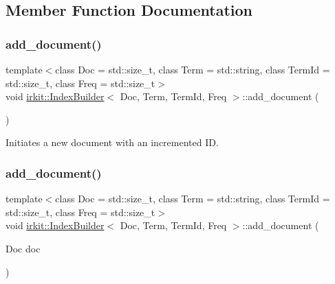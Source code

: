 \subsection{Member Function Documentation}
\mbox{\label{classirkit_1_1IndexBuilder_a8a18c112d48e21a89aefa9a931a536ab}} 
\subsubsection{\texorpdfstring{add\+\_\+document()}{add\_document()}\hspace{0.1cm}{\footnotesize\ttfamily [1/2]}}
{\footnotesize\ttfamily template$<$class Doc  = std\+::size\+\_\+t, class Term  = std\+::string, class Term\+Id  = std\+::size\+\_\+t, class Freq  = std\+::size\+\_\+t$>$ \\
void \mbox{\hyperlink{classirkit_1_1IndexBuilder}{irkit\+::\+Index\+Builder}}$<$ Doc, Term, Term\+Id, Freq $>$\+::add\+\_\+document (\begin{DoxyParamCaption}{ }\end{DoxyParamCaption})\hspace{0.3cm}{\ttfamily [inline]}}



Initiates a new document with an incremented ID. 

\mbox{\label{classirkit_1_1IndexBuilder_a31b062283c9b7203ce4a65a5bd744fae}} 
\subsubsection{\texorpdfstring{add\+\_\+document()}{add\_document()}\hspace{0.1cm}{\footnotesize\ttfamily [2/2]}}
{\footnotesize\ttfamily template$<$class Doc  = std\+::size\+\_\+t, class Term  = std\+::string, class Term\+Id  = std\+::size\+\_\+t, class Freq  = std\+::size\+\_\+t$>$ \\
void \mbox{\hyperlink{classirkit_1_1IndexBuilder}{irkit\+::\+Index\+Builder}}$<$ Doc, Term, Term\+Id, Freq $>$\+::add\+\_\+document (\begin{DoxyParamCaption}\item[{Doc}]{doc }\end{DoxyParamCaption})\hspace{0.3cm}{\ttfamily [inline]}}



